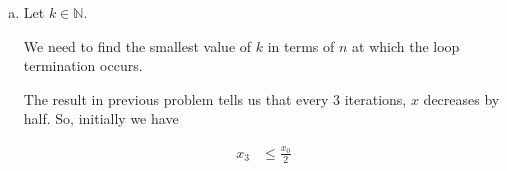\documentclass[12pt]{article}
\begin{document}
\begin{enumerate}[a.]
\begin{proof}
        Assume $x$ is divisible by 2, 2 times.

        \bigskip

        Because we know \textbf{$x \mod 2$ == 0} is true in first two
        iterations, we can conclude the line \textbf{$\frac{x}{2}$ // 2} will run twice.

        \bigskip

        Then, at the end of second iteration, we can conclude $x$ will have the value of

        \begin{align}
            \frac{x_{3k}}{2}
        \end{align}

        \bigskip

        On the final iteration, because we know \textbf{$x \mod 2$ == 0} is false,
        we can conclude the line \textbf{x = 2 * x - 2} will run.

        \bigskip

        Then, using the above fact, we can calculate

        \begin{align}
            x_{3(k+1)} &= \frac{x_{3k}}{2^2} \cdot 2 - 2\\
            &= \frac{x_{3k}}{2} - 2\\
            &\leq \frac{x_{3k}}{2}
        \end{align}

        \bigskip

        \textbf{Case 3 ($x$ divisible by 2 once):}

        \bigskip

        \textbf{Case 4 ($x$ is an odd number):}

    \end{proof}

    \item

    Let $k \in \mathbb{N}$.

    \bigskip

    We need to find the smallest value of $k$ in terms of $n$ at which the loop
    termination occurs.

    \bigskip

    The result in previous problem tells us that every 3 iterations, $x$ decreases
    by half. So, initially we have

    \setcounter{equation}{0}
    \begin{align}
        x_3 &\leq \frac{x_0}{2}
    \end{align}


\end{enumerate}
\end{document}

